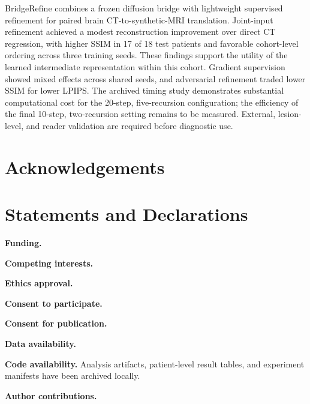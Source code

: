 BridgeRefine combines a frozen diffusion bridge with lightweight supervised refinement for paired brain CT-to-synthetic-MRI translation. Joint-input refinement achieved a modest reconstruction improvement over direct CT regression, with higher SSIM in 17 of 18 test patients and favorable cohort-level ordering across three training seeds. These findings support the utility of the learned intermediate representation within this cohort. Gradient supervision showed mixed effects across shared seeds, and adversarial refinement traded lower SSIM for lower LPIPS. The archived timing study demonstrates substantial computational cost for the 20-step, five-recursion configuration; the efficiency of the final 10-step, two-recursion setting remains to be measured. External, lesion-level, and reader validation are required before diagnostic use.

\section*{Acknowledgements}

\section*{Statements and Declarations}

\textbf{Funding.} 

\textbf{Competing interests.} 

\textbf{Ethics approval.} 

\textbf{Consent to participate.} 

\textbf{Consent for publication.} 

\textbf{Data availability.} 

\textbf{Code availability.} Analysis artifacts, patient-level result tables, and experiment manifests have been archived locally. 

\textbf{Author contributions.} 


